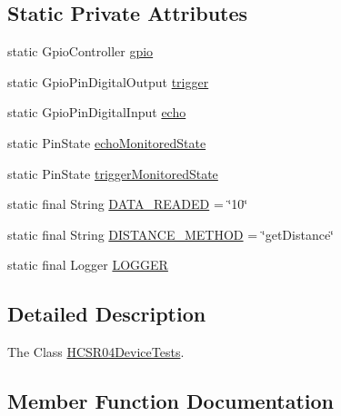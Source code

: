 \subsection*{Static Private Attributes}
\begin{DoxyCompactItemize}
\item 
static Gpio\+Controller \hyperlink{classcom_1_1libsensorj_1_1concretesensor_1_1test_1_1HCSR04DeviceTests_a633636296bc508c587ec96215ae90f49}{gpio}
\item 
static Gpio\+Pin\+Digital\+Output \hyperlink{classcom_1_1libsensorj_1_1concretesensor_1_1test_1_1HCSR04DeviceTests_a1284eaac23d3414b8115c58e3daf10c0}{trigger}
\item 
static Gpio\+Pin\+Digital\+Input \hyperlink{classcom_1_1libsensorj_1_1concretesensor_1_1test_1_1HCSR04DeviceTests_aa5c0c872aec976b3c6eba9ca14eaee21}{echo}
\item 
static Pin\+State \hyperlink{classcom_1_1libsensorj_1_1concretesensor_1_1test_1_1HCSR04DeviceTests_aa1dee7612489b95ae1e84834018f612c}{echo\+Monitored\+State}
\item 
static Pin\+State \hyperlink{classcom_1_1libsensorj_1_1concretesensor_1_1test_1_1HCSR04DeviceTests_ae6c52d9bfe127814bf0b2566d4671ef3}{trigger\+Monitored\+State}
\item 
static final String \hyperlink{classcom_1_1libsensorj_1_1concretesensor_1_1test_1_1HCSR04DeviceTests_a76e128e04a46245fcef0b87f377b9b7c}{D\+A\+T\+A\+\_\+\+R\+E\+A\+D\+E\+D} = \char`\"{}10\char`\"{}
\item 
static final String \hyperlink{classcom_1_1libsensorj_1_1concretesensor_1_1test_1_1HCSR04DeviceTests_a47cef441c2f68e1f55e5dfb6b1fef3c8}{D\+I\+S\+T\+A\+N\+C\+E\+\_\+\+M\+E\+T\+H\+O\+D} = \char`\"{}get\+Distance\char`\"{}
\item 
static final Logger \hyperlink{classcom_1_1libsensorj_1_1concretesensor_1_1test_1_1HCSR04DeviceTests_a5bceb1147cb539bde62dad0d4f95e3cf}{L\+O\+G\+G\+E\+R}
\end{DoxyCompactItemize}


\subsection{Detailed Description}
The Class \hyperlink{classcom_1_1libsensorj_1_1concretesensor_1_1test_1_1HCSR04DeviceTests}{H\+C\+S\+R04\+Device\+Tests}. 

\subsection{Member Function Documentation}
\hypertarget{classcom_1_1libsensorj_1_1concretesensor_1_1test_1_1HCSR04DeviceTests_a03c2c422c08b49925990bc542e72020a}{}

